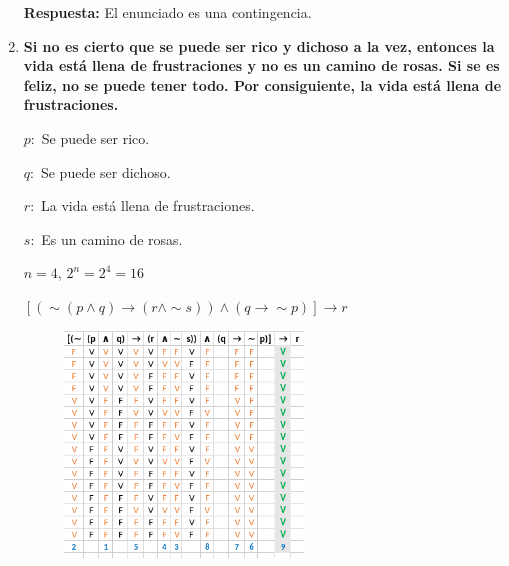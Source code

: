 \documentclass[12pt]{article}
\begin{document}
\begin{enumerate}
                \textbf{Respuesta:} El enunciado es una contingencia.

             \newpage
            \item \textbf{Si no es cierto que se puede ser rico y dichoso a la vez, entonces la vida está llena de frustraciones y no es un camino de rosas. Si se es feliz, no se puede tener todo. Por consiguiente, la vida está llena de frustraciones.}
                \par$p:$ Se puede ser rico.
                \par$q:$ Se puede ser dichoso.
                \par$r:$ La vida está llena de frustraciones.
                \par$s:$ Es un camino de rosas.
                \par$n = 4$, $2^n = 2^4 = 16$
                \par\vspace{0.5cm}$[(\sim (p \wedge q) \longrightarrow (r \wedge \sim s)) \wedge (q \longrightarrow \sim p)] \longrightarrow r$
             
                \begin{figure}[!h]
                    \centering
                    \includegraphics[width=0.6\textwidth]{Img/Tarea4_ej3.png}
                \end{figure}


\end{enumerate}
\end{document}
